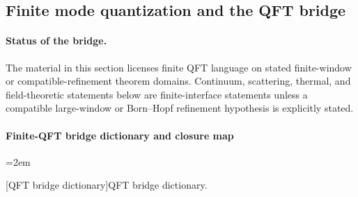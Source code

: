 \documentclass[12pt,a4paper]{article}
\begin{document}
\subsection{Finite mode quantization and the QFT bridge}
\label{p4:sec:part2-qft-bridge}

\paragraph{Status of the bridge.}
The material in this section licenses finite QFT language on stated finite-window or compatible-refinement theorem domains.  Continuum, scattering, thermal, and field-theoretic statements below are finite-interface statements unless a compatible large-window or Born--Hopf refinement hypothesis is explicitly stated.




\paragraph*{Finite-QFT bridge dictionary and closure map}
\label{p4:sec:qft-bridge-dictionary}

\begingroup
\small
\setlength{\LTleft}{0pt}
\setlength{\LTright}{0pt}
\setlength{\tabcolsep}{5pt}
\renewcommand{\arraystretch}{1.16}
\emergencystretch=2em
\captionsetup{hypcap=false}

[QFT bridge dictionary]{QFT bridge dictionary.}
\label{p4:tab:qft-bridge-dictionary}
\end{document}
